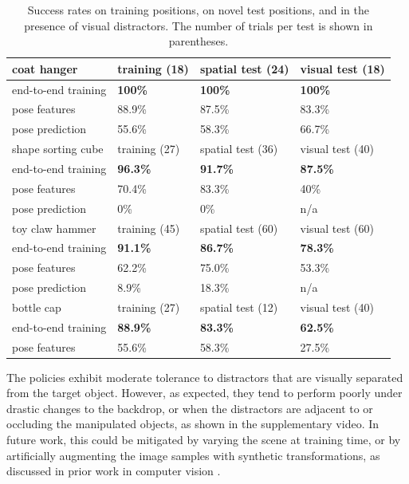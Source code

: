 \documentclass[conference]{IEEEtran}
\begin{document}
\begin{table}[h!]
{\footnotesize
  \begin{center}
    \begin{tabular}{| l | l | l | l |}
    \hline
    coat hanger & training (18) & spatial test (24) & visual test (18)\\
    \hline
    end-to-end training & {\bf 100\%} & {\bf 100\%} & {\bf 100\%} \\
    \hline
    pose features & 88.9\% & 87.5\% & 83.3\% \\
    \hline
    pose prediction & 55.6\% & 58.3\% & 66.7\%  \\
    \hline
    \hline
    shape sorting cube & training (27) & spatial test (36) & visual test (40) \\
    \hline
    end-to-end training & {\bf 96.3\%} & {\bf 91.7\%} & {\bf 87.5\%} \\
    \hline
    pose features & 70.4\% & 83.3\% & 40\%\\
    \hline
    pose prediction & 0\% & 0\% & n/a\\
    \hline
    \hline
    toy claw hammer & training (45) & spatial test (60) & visual test (60) \\
    \hline
    end-to-end training & {\bf 91.1\%} & {\bf 86.7\%} & {\bf 78.3\%} \\
    \hline
    pose features & 62.2\% & 75.0\% & 53.3\%\\
    \hline
    pose prediction & 8.9\% & 18.3\% & n/a\\
    \hline
    \hline
    bottle cap & training (27) & spatial test (12) & visual test (40) \\
    \hline
    end-to-end training & {\bf 88.9\%} & {\bf 83.3\%} & {\bf 62.5\%}\\
    \hline
    pose features & 55.6\% & 58.3\% & 27.5\%\\
    \hline
    \end{tabular}
  \end{center}
}
\vspace{-0.1in}
  \caption{Success rates on training positions, on novel test positions, and in the presence of visual distractors. The number of trials per test is shown in parentheses.}
  \label{tbl:results}
\vspace{-0.15in}
\end{table}

The policies exhibit moderate tolerance to distractors that are visually separated from the target object. However, as expected, they tend to perform poorly under drastic changes to the backdrop, or when the distractors are adjacent to or occluding the manipulated objects, as shown in the supplementary video. In future work, this could be mitigated by varying the scene at training time, or by artificially augmenting the image samples with synthetic transformations, as discussed in prior work in computer vision \cite{ssp-bpcnn-03}.
\end{document}
